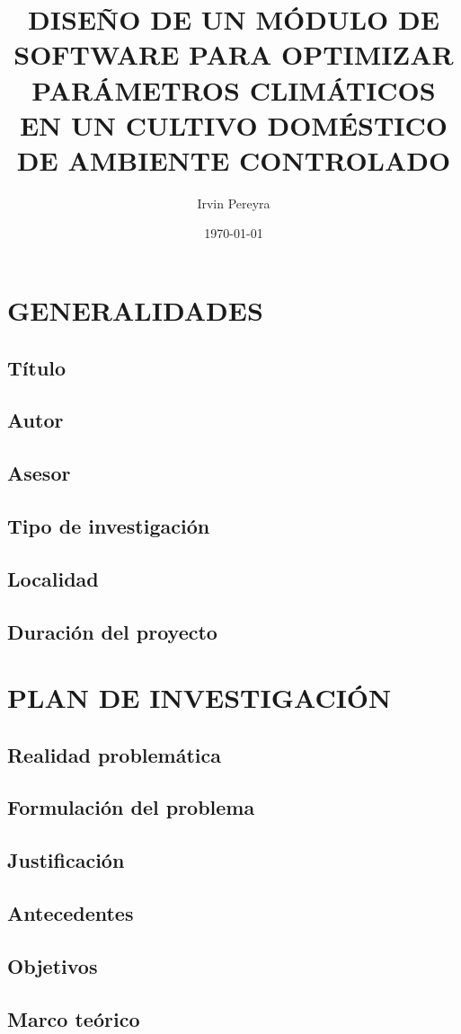 \documentclass{report}
\title{DISEÑO DE UN MÓDULO DE SOFTWARE PARA OPTIMIZAR PARÁMETROS CLIMÁTICOS EN
  UN CULTIVO DOMÉSTICO DE AMBIENTE CONTROLADO}
\author{Irvin Pereyra}
\date{\today}
\begin{document}
\tableofcontents
{}

\section{GENERALIDADES}
\subsection{Título}
\subsection{Autor}
\subsection{Asesor}
\subsection{Tipo de investigación}
\subsection{Localidad}
\subsection{Duración del proyecto}

\section{PLAN DE INVESTIGACIÓN}
\subsection{Realidad problemática}
\subsection{Formulación del problema}
\subsection{Justificación}
\subsection{Antecedentes}
\subsection{Objetivos}
\subsection{Marco teórico}
\end{document}
